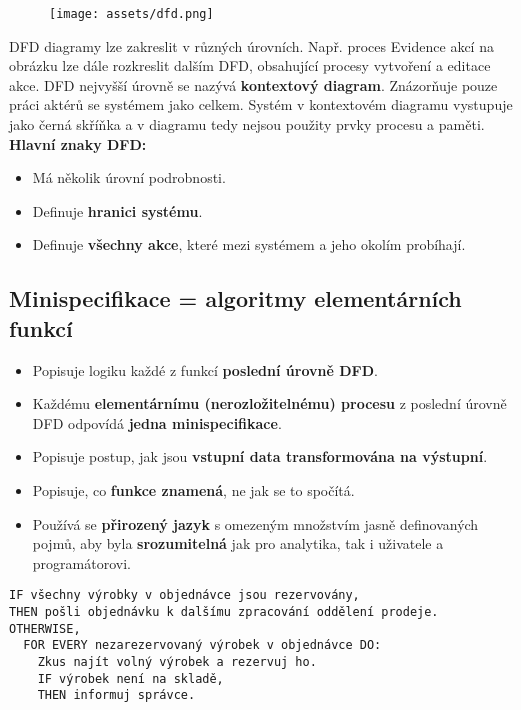 \begin{figure}[H]
    \centering
    \texttt{[image: assets/dfd.png]}
\end{figure}

DFD diagramy lze zakreslit v různých úrovních. Např. proces Evidence akcí na obrázku lze dále rozkreslit dalším DFD, obsahující procesy vytvoření a editace akce. DFD nejvyšší úrovně se nazývá \textbf{kontextový diagram}. Znázorňuje pouze práci aktérů se systémem jako celkem. Systém v kontextovém diagramu vystupuje jako černá skříňka a v diagramu tedy nejsou použity prvky procesu a paměti.
\textbf{Hlavní znaky DFD:}

\begin{itemize}
    \item Má několik úrovní podrobnosti.
    \item Definuje \textbf{hranici systému}.
    \item Definuje \textbf{všechny akce}, které mezi systémem a jeho okolím probíhají.
\end{itemize}

\subsection{Minispecifikace = algoritmy elementárních funkcí}
\begin{itemize}
    \item Popisuje logiku každé z funkcí \textbf{poslední úrovně DFD}.
    \item Každému \textbf{elementárnímu (nerozložitelnému) procesu} z poslední úrovně DFD odpovídá \textbf{jedna minispecifikace}.
    \item Popisuje postup, jak jsou \textbf{vstupní data transformována na výstupní}.
    \item Popisuje, co \textbf{funkce znamená}, ne jak se to spočítá.
    \item Používá se \textbf{přirozený jazyk} s omezeným množstvím jasně definovaných pojmů, aby byla \textbf{srozumitelná} jak pro analytika, tak i uživatele a programátorovi.
\end{itemize}

\smallskip
\begin{verbatim}
IF všechny výrobky v objednávce jsou rezervovány,
THEN pošli objednávku k dalšímu zpracování oddělení prodeje.
OTHERWISE,
  FOR EVERY nezarezervovaný výrobek v objednávce DO:
    Zkus najít volný výrobek a rezervuj ho.
    IF výrobek není na skladě,
    THEN informuj správce.
\end{verbatim}